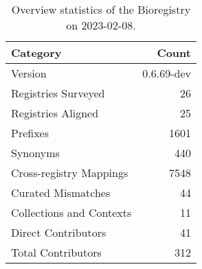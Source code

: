 \begin{table}
\centering
\caption{Overview statistics of the Bioregistry on 2023-02-08.}
\label{tab:bioregistry-summary}
\begin{tabular}{lr}
\toprule
                Category &      Count \\
\midrule
                 Version & 0.6.69-dev \\
     Registries Surveyed &         26 \\
      Registries Aligned &         25 \\
                Prefixes &       1601 \\
                Synonyms &        440 \\
 Cross-registry Mappings &       7548 \\
      Curated Mismatches &         44 \\
Collections and Contexts &         11 \\
     Direct Contributors &         41 \\
      Total Contributors &        312 \\
\bottomrule
\end{tabular}
\end{table}
